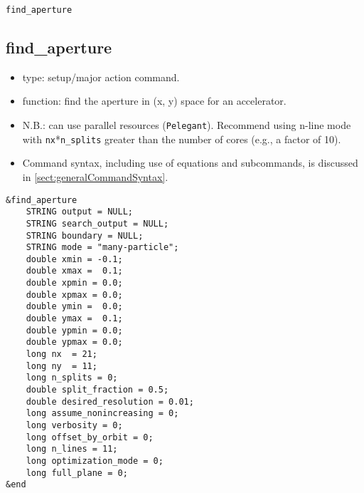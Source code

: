 \documentclass[11pt]{article}
\begin{document}
\newpage
\begin{center}{\Large\verb|find_aperture|}\end{center}
\subsection{find\_aperture \label{subsec:findaperture}}

\begin{itemize}
\item type: setup/major action command.
\item function: find the aperture in (x, y) space for an accelerator.
\item N.B.: can use parallel resources (\verb|Pelegant|). Recommend using n-line mode with \verb|nx|*\verb|n_splits|
  greater than the number of cores (e.g., a factor of 10).
\item Command syntax, including use of equations and subcommands, is discussed in \ref{sect:generalCommandSyntax}.
\end{itemize}

\begin{verbatim}
&find_aperture
    STRING output = NULL;
    STRING search_output = NULL;
    STRING boundary = NULL;
    STRING mode = "many-particle";
    double xmin = -0.1;
    double xmax =  0.1;
    double xpmin = 0.0;
    double xpmax = 0.0;
    double ymin =  0.0;
    double ymax =  0.1;
    double ypmin = 0.0;
    double ypmax = 0.0;
    long nx  = 21;
    long ny  = 11;
    long n_splits = 0;
    double split_fraction = 0.5;
    double desired_resolution = 0.01;
    long assume_nonincreasing = 0;
    long verbosity = 0;    
    long offset_by_orbit = 0;
    long n_lines = 11;
    long optimization_mode = 0;
    long full_plane = 0;
&end
\end{verbatim}
\end{document}
